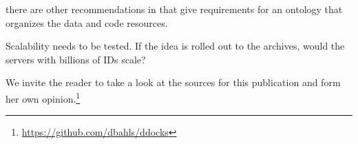 \documentclass{acm_proc_article-sp}
\begin{document}
%
%
%

there are other recommendations in \cite{kleiber2012reproducible}   %
that give requirements for an ontology that organizes the data and code resources.

%
%
\cite{KoenkerZeileis2009}
\cite{RePEc_ejw_journl_v_4_y_2007_i_3_p_326_337}

\cite{baiocchi2007reproducible}

\cite{gentleman2007statistical}

\cite{rahmandad2012reporting}

%
%
%






Scalability needs to be tested. If the idea is rolled out to the archives, would the servers with billions of IDs scale?




We invite the reader to take a look at the sources for this publication and form her own opinion.\footnote{\url{https://github.com/dbahls/ddocks}}


\balancecolumns






 
\end{document}
